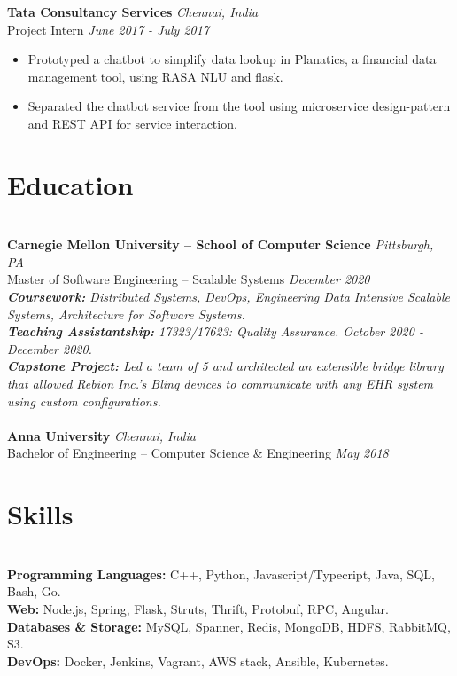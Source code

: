 \documentclass{resume}
\begin{document}
\textbf{Tata Consultancy Services} \hfill \textit{Chennai, India} \\
{\small Project Intern} \hfill \textit{\small June 2017 - July 2017}
\begin{itemize}
  \item Prototyped a chatbot to simplify data lookup in Planatics, a financial data management tool, using RASA NLU and flask.
  \item Separated the chatbot service from the tool using microservice design-pattern and REST API for service interaction.
\end{itemize}
	
\section*{Education}
\titlerule[0.2pt]
\noindent
\\
\textbf{Carnegie Mellon University -- School of Computer Science} \hfill \textit{Pittsburgh, PA} \\
{\small Master of Software Engineering -- Scalable Systems} \hfill \textit{\small December 2020}\\
\textit{\textbf{Coursework:} Distributed Systems, DevOps, Engineering Data Intensive Scalable Systems, Architecture for Software Systems.}\\
\textit{\textbf{Teaching Assistantship:} 17323/17623: Quality Assurance. October 2020 - December 2020.}\\
\textit{\textbf{Capstone Project:} Led a team of 5 and architected an extensible bridge library that allowed Rebion Inc.'s Blinq devices to communicate with any EHR system using custom configurations.}\\
\\
\textbf{Anna University} \hfill \textit{Chennai, India} \\
{\small Bachelor of Engineering -- Computer Science \& Engineering} \hfill \textit{\small May 2018}

\section*{Skills}
\titlerule[0.2pt]
\noindent
\\
\textbf{Programming Languages:} C++, Python, Javascript/Typecript, Java, SQL, Bash, Go. \\
\textbf{Web:} Node.js, Spring, Flask, Struts, Thrift, Protobuf, RPC, Angular. \\
\textbf{Databases \& Storage:} MySQL, Spanner, Redis, MongoDB, HDFS, RabbitMQ, S3. \\
\textbf{DevOps:} Docker, Jenkins, Vagrant, AWS stack, Ansible, Kubernetes. \\

\end{document}
